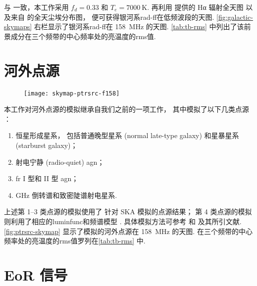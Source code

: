 与  一致，本工作采用 $f_d = 0.33$
和 $T_e = \SI{7000}{\kelvin}$.
再利用  提供的 Hα 辐射全天图
以及来自  的全天尘埃分布图，
便可获得银河系\ac{rad-ff}在低频波段的天图.
\autoref{fig:galactic-skymaps} 右栏显示了银河系\ac{rad-ff}在 \SI{158}{\MHz} 的天图.
\autoref{tab:tb-rms} 中列出了该前景成分在三个频带的中心频率处的亮温度的\ac{rms}值.


\section{河外点源}
\label{sec:simu-eg-point}

\begin{figure}[htp]
  \centering
  \texttt{[image: skymap-ptrsrc-f158]}
  \label{fig:ptrsrc-skymap}
\end{figure}

本工作对河外点源的模拟继承自我们之前的一项工作\cite{wang2010}，
其中模拟了以下几类点源 \cite{snellen2000,wilman2008,wang2010}：
\begin{enumerate}
  \item 恒星形成星系，
    包括普通晚型星系 (normal late-type galaxy) 和星暴星系 (starburst galaxy)；
  \item 射电宁静 (radio-quiet) \ac{agn}；
  \item \ac{fr} I 型和 II 型 \ac{agn}；
  \item GHz 倒转谱和致密陡谱射电星系.
\end{enumerate}
上述第 1--3 类点源的模拟使用了  针对 SKA 模拟的点源结果；
第 4 类点源的模拟则利用了相应的\ac{luminfunc}和频谱模型
\cite{oDea1998,snellen1998,fanti2001}.
具体模拟方法可参考  和  及其所引文献.
\autoref{fig:ptrsrc-skymap} 显示了模拟的河外点源在 \SI{158}{\MHz} 的天图.
在三个频带的中心频率处的亮温度的\ac{rms}值罗列在\autoref{tab:tb-rms} 中.


\section{EoR 信号}
\label{sec:simu-eor}

